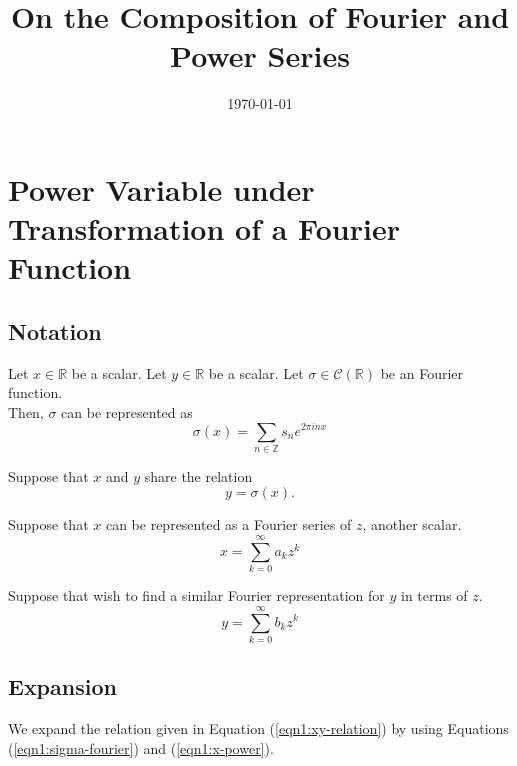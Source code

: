 \documentclass{article}
\title{On the Composition of Fourier and Power Series}
\date{\today}
\begin{document}
    \maketitle

    \section{Power Variable under Transformation of a Fourier Function}

    \subsection{Notation}
    Let $x \in \mathbb{R}$ be a scalar. Let $y \in \mathbb{R}$ be a scalar. Let $\sigma \in \mathcal{C}(\mathbb{R})$ be an Fourier function.\\
    
    Then, $\sigma$ can be represented as
    \begin{equation}
        \sigma(x) = \sum_{n \in \mathbb{Z}} s_n e^{2\pi inx}
        \label{eqn1:sigma-fourier}
    \end{equation}
    
    Suppose that $x$ and $y$ share the relation
    \begin{equation}
        y = \sigma(x).
        \label{eqn1:xy-relation}
    \end{equation}
    
    Suppose that $x$ can be represented as a Fourier series of $z$, another scalar.
    \begin{equation}
        x = \sum_{k=0}^{\infty} a_k z^k
        \label{eqn1:x-power}
    \end{equation}
    
    Suppose that wish to find a similar Fourier representation for $y$ in terms of $z$.
    \begin{equation}
        y = \sum_{k=0}^{\infty} b_k z^k
        \label{eqn1:y-power}
    \end{equation}
    
    \subsection{Expansion}
    We expand the relation given in Equation (\ref{eqn1:xy-relation}) by using Equations (\ref{eqn1:sigma-fourier}) and (\ref{eqn1:x-power}).
    
\end{document}
